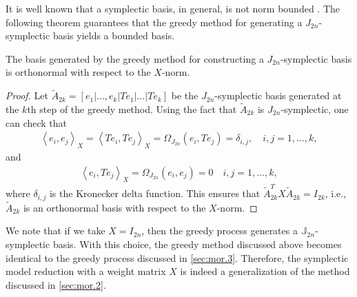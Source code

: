 It is well known that a symplectic basis, in general, is not norm bounded \cite{doi:10.1137/050628519}. The following theorem guarantees that the greedy method for generating a $J_{2n}$-symplectic basis yields a bounded basis.
\begin{theorem} \label{thm:3}
The basis generated by the greedy method for constructing a $J_{2n}$-symplectic basis is orthonormal with respect to the $X$-norm.
\end{theorem}
\begin{proof}
Let $\tilde A_{2k}=[e_1|\dots,e_k|Te_1|\dots|Te_k]$ be the $J_{2n}$-symplectic basis generated at the $k$th step of the greedy method. Using the fact that $\tilde A_{2k}$ is $J_{2n}$-symplectic, one can check that
\begin{eqnarray} \label{eq:normmor.12}
	\left\langle e_i,e_j\right\rangle_X = \left\langle Te_i,Te_j\right\rangle_X = \Omega_{J_{2n}}(e_i,Te_j)=\delta_{i,j}, \quad i,j=1,\dots,k,	
\end{eqnarray}
and
\begin{eqnarray} \label{eq:normmor.13}
	\left\langle e_i,Te_j \right\rangle_X = \Omega_{J_{2n}}(e_i,e_j) = 0\quad i,j=1,\dots,k,
\end{eqnarray}
where $\delta_{i,j}$ is the Kronecker delta function. This ensures that $\tilde A_{2k}^TX\tilde A_{2k} = I_{2k}$, i.e., $\tilde A_{2k}$ is an orthonormal basis with respect to the $X$-norm.
\end{proof}
We note that if we take $X=I_{2n}$, then the greedy process generates a $\mathbb J_{2n}$- symplectic basis. With this choice, the greedy method discussed above becomes identical to the greedy process discussed in \cref{sec:mor.3}. Therefore, the symplectic model reduction with a weight matrix $X$ is indeed a generalization of the method discussed in \cref{sec:mor.2}.

